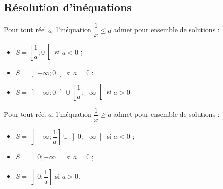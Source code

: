 \newpage

\subsection{Résolution d'inéquations}


\begin{minipage}[c]{0.45\linewidth}

\begin{Propriété}
Pour tout réel $a$, l'inéquation $\dfrac{1}{x}\leq a$ admet pour ensemble de solutions :
\begin{itemize}[label=\textcolor{Couleur2}{$\bullet$}]
\item $S=\left[\dfrac{1}{a};0\right[$ si $a<0$ ;
\item $S=\left]-\infty;0\right[$ si $a=0$ ; 
\item $S=\left]-\infty;0\right[\cup \left[\dfrac{1}{a};+\infty\right[$ si $a>0$.
\end{itemize}
\end{Propriété}
\end{minipage} \hfill
\begin{minipage}[c]{0.45\linewidth}
\begin{Propriété}
Pour tout réel $a$, l'inéquation $\dfrac{1}{x}\geq a$ admet pour ensemble de solutions :
\begin{itemize}[label=\textcolor{Couleur2}{$\bullet$}]
\item $S=\left]-\infty;\dfrac{1}{a}\right]\cup \left]0;+\infty\right[$ si $a<0$ ;
\item $S=\left]0;+\infty\right[$ si $a=0$ ; 
\item $S=\left]0;\dfrac{1}{a}\right]$ si $a>0$.
\end{itemize}
\end{Propriété}

\end{minipage}


